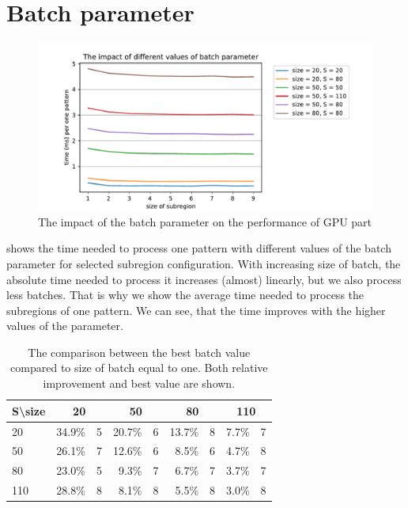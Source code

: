 \section{Batch parameter}
\label{batch-param-eval}

\begin{figure}
	\centering
	\includegraphics[width=\textwidth]{img/eval/batch-plot}
	\caption{The impact of the batch parameter on the performance of GPU part}
	\label{batch-plot}
\end{figure}



 shows the time needed to process one pattern with different values of the batch parameter for selected subregion configuration. With increasing size of batch, the absolute time needed to process it increases (almost) linearly, but we also process less batches. That is why we show the average time needed to process the subregions of one pattern. We can see, that the time improves with the higher values of the parameter.

\begin{table}[]
	\centering
	\begin{tabular}{@{}l|rrrrrrrr@{}}
		S\textbackslash size & \multicolumn{2}{c}{20} & \multicolumn{2}{c}{50} & \multicolumn{2}{c}{80} & \multicolumn{2}{c}{110} \\ \midrule
		20                   & 34.9\% &             5 & 20.7\% &             6 & 13.7\% &             8 & 7.7\% &               7 \\
		50                   & 26.1\% &             7 & 12.6\% &             6 &  8.5\% &             6 & 4.7\% &               8 \\
		80                   & 23.0\% &             5 &  9.3\% &             7 &  6.7\% &             7 & 3.7\% &               7 \\
		110                  & 28.8\% &             8 &  8.1\% &             8 &  5.5\% &             8 & 3.0\% &               8
	\end{tabular}
	\caption{The comparison between the best batch value compared to size of batch equal to one. Both relative improvement and best value are shown.}
	\label{batch-table}
\end{table}

